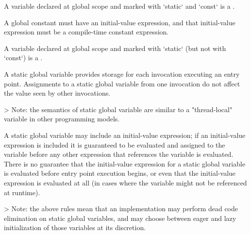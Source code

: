 
A variable declared at global scope and marked with `static` and `const` is a .

A global constant must have an initial-value expression, and that initial-value expression must be a compile-time constant expression.


A variable declared at global scope and marked with `static` (but not with `const`) is a .

A static global variable provides storage for each invocation executing an entry point.
Assignments to a static global variable from one invocation do not affect the value seen by other invocations.

> Note: the semantics of static global variable are similar to a "thread-local" variable in other programming models.

A static global variable may include an initial-value expression; if an initial-value expression is included it is guaranteed to be evaluated and assigned to the variable before any other expression that references the variable is evaluated.
There is no guarantee that the initial-value expression for a static global variable is evaluated before entry point execution begins, or even that the initial-value expression is evaluated at all (in cases where the variable might not be referenced at runtime).

> Note: the above rules mean that an implementation may perform dead code elimination on static global variables, and may choose between eager and lazy initialization of those variables at its discretion.


